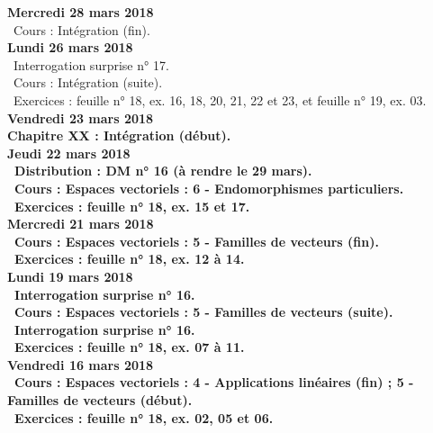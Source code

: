 \documentclass[12pt,a4paper]{article}
\begin{document}
\noindent\textbf{Mercredi 28 mars 2018} \\
\bu\ Cours : Intégration (fin).\vspace{.4cm}\\

\noindent\textbf{\bf Lundi 26 mars 2018} \\
\bu\ Interrogation surprise n° 17.\\
\bu\ Cours : Intégration (suite).\\
\bu\ Exercices : feuille n° 18, ex. 16, 18, 20, 21, 22 et 23, et feuille n° 19, ex. 03.\vspace{.4cm}\\

\noindent\textbf{Vendredi 23 mars 2018}\\
\bf Chapitre XX \rm : Intégration (début).\vspace{.4cm}\\

\noindent\textbf{Jeudi 22 mars 2018}\\
\bu\ Distribution : DM n° 16 (à rendre le 29 mars).\\
\bu\ Cours : Espaces vectoriels : 6 - Endomorphismes particuliers.\\
\bu\ Exercices : feuille n° 18, ex. 15 et 17.\vspace{.4cm}\\

\noindent\textbf{Mercredi 21 mars 2018} \\
\bu\ Cours : Espaces vectoriels : 5 - Familles de vecteurs (fin).\\
\bu\ Exercices : feuille n° 18, ex. 12 à 14.\vspace{.4cm}\\

\noindent\textbf{\bf Lundi 19 mars 2018} \\
\bu\ Interrogation surprise n° 16.\\
\bu\ Cours : Espaces vectoriels : 5 - Familles de vecteurs (suite).\\
\bu\ Interrogation surprise n° 16.\\
\bu\ Exercices : feuille n° 18, ex. 07 à 11.\vspace{.4cm}\\

\noindent\textbf{Vendredi 16 mars 2018}\\
\bu\ Cours : Espaces vectoriels : 4 - Applications linéaires (fin) ; 5 - Familles de vecteurs (début).\\
\bu\ Exercices : feuille n° 18, ex. 02, 05 et 06.\vspace{.4cm}\\
\end{document}
